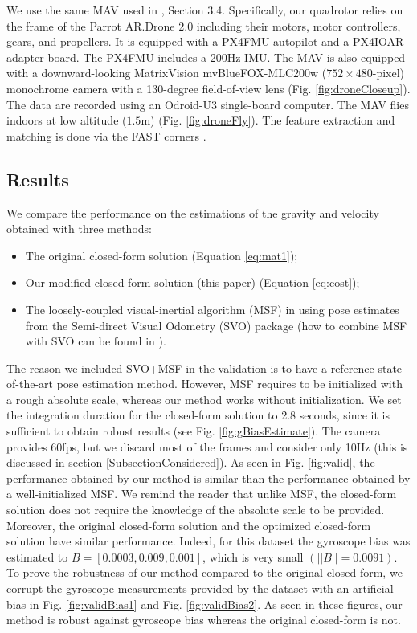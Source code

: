 \documentclass[letterpaper, 10 pt, conference]{ieeeconf}  %
\begin{document}
We use the same MAV used in \cite{FaesslerICRA15}, Section 3.4.
Specifically, our quadrotor relies on the frame of the Parrot AR.Drone 2.0 including their motors, motor controllers, gears, and propellers.
It is equipped with a PX4FMU autopilot and a PX4IOAR adapter board.
The PX4FMU includes a 200Hz IMU.
The MAV is also equipped with a downward-looking MatrixVision mvBlueFOX-MLC200w ($752 \times 480$-pixel) monochrome camera with a 130-degree field-of-view lens (Fig. \ref{fig:droneCloseup}).
The data are recorded using an Odroid-U3 single-board computer.
The MAV flies indoors at low altitude ($1.5$m) (Fig. \ref{fig:droneFly}).
The feature extraction and matching is done via the FAST corners \cite{Rosten2005, Rosten2006}.

\subsection{Results}

We compare the performance on the estimations of the gravity and velocity obtained with three methods:
\begin{itemize}
\item The original closed-form solution \cite{Martinelli2014} (Equation \ref{eq:mat1});
\item Our modified closed-form solution (this paper) (Equation \ref{eq:cost});
\item The loosely-coupled visual-inertial algorithm (MSF) in \cite{LynenIROS13} using pose estimates from the Semi-direct Visual Odometry (SVO) package \cite{Forster2014} (how to combine MSF \cite{LynenIROS13} with SVO can be found in \cite{FaesslerICRA15}).
\end{itemize}
The reason we included SVO+MSF in the validation is to have a reference state-of-the-art pose estimation method.
However, MSF requires to be initialized with a rough absolute scale, whereas our method works without initialization.
We set the integration duration for the closed-form solution to 2.8 seconds, since it is sufficient to obtain robust results (see Fig. \ref{fig:gBiasEstimate}).
The camera provides 60fps, but we discard most of the frames and consider only 10Hz (this is discussed in section \ref{SubsectionConsidered}).
As seen in Fig. \ref{fig:valid}, the performance obtained by our method is similar than the performance obtained by a well-initialized MSF.
We remind the reader that unlike MSF, the closed-form solution does not require the knowledge of the absolute scale to be provided.
Moreover, the original closed-form solution and the optimized closed-form solution have similar performance.
Indeed, for this dataset the gyroscope bias was estimated to $B = [0.0003, 0.009, 0.001]$, which is very small $(||B|| = 0.0091)$.
To prove the robustness of our method compared to the original closed-form,
we corrupt the gyroscope measurements provided by the dataset with an artificial bias in Fig. \ref{fig:validBias1} and Fig. \ref{fig:validBias2}.
As seen in these figures, our method is robust against gyroscope bias whereas the original closed-form is not.
\end{document}
